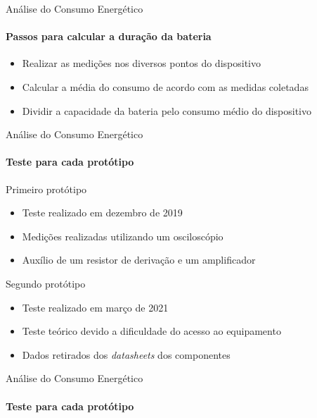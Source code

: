 \begin{frame}{Análise do Consumo Energético}
  \framesubtitle{Passos para calcular a duração da bateria}
  \begin{itemize}
    \item Realizar as medições nos diversos pontos do dispositivo
    \item Calcular a média do consumo de acordo com as medidas coletadas
    \item Dividir a capacidade da bateria pelo consumo médio do dispositivo
  \end{itemize}
\end{frame}

\begin{frame}{Análise do Consumo Energético}
  \framesubtitle{Teste para cada protótipo}
  Primeiro protótipo
  \begin{itemize}
    \item Teste realizado em dezembro de 2019
    \item Medições realizadas utilizando um osciloscópio
    \item Auxílio de um resistor de derivação e um amplificador
  \end{itemize}

  \bigskip Segundo protótipo
  \begin{itemize}
    \item Teste realizado em março de 2021
    \item Teste teórico devido a dificuldade do acesso ao equipamento
    \item Dados retirados dos \textit{datasheets} dos componentes
  \end{itemize}
\end{frame}

\begin{frame}{Análise do Consumo Energético}
  \framesubtitle{Teste para cada protótipo}
\end{frame}

